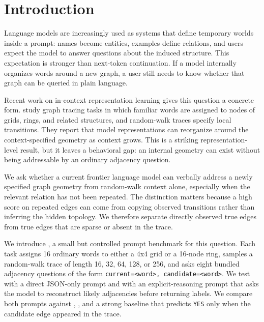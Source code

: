 \section{Introduction}
\label{sec:introduction}

Language models are increasingly used as systems that define temporary worlds inside a prompt: names become entities, examples define relations, and users expect the model to answer questions about the induced structure. This expectation is stronger than next-token continuation. If a model internally organizes words around a new graph, a user still needs to know whether that graph can be queried in plain language.

Recent work on in-context representation learning gives this question a concrete form. \citet{park2025iclr} study graph tracing tasks in which familiar words are assigned to nodes of grids, rings, and related structures, and random-walk traces specify local transitions. They report that model representations can reorganize around the context-specified geometry as context grows. This is a striking representation-level result, but it leaves a behavioral gap: an internal geometry can exist without being addressable by an ordinary adjacency question.

We ask whether a current frontier language model can verbally address a newly specified graph geometry from random-walk context alone, especially when the relevant relation has not been repeated. The distinction matters because a high score on repeated edges can come from copying observed transitions rather than inferring the hidden topology. We therefore separate directly observed true edges from true edges that are sparse or absent in the trace.

We introduce \taskname, a small but controlled prompt benchmark for this question. Each task assigns 16 ordinary words to either a 4x4 grid or a 16-node ring, samples a random-walk trace of length 16, 32, 64, 128, or 256, and asks eight bundled adjacency questions of the form \texttt{current=<word>, candidate=<word>}. We test \gptfourone with a direct JSON-only prompt and with an explicit-reasoning prompt that asks the model to reconstruct likely adjacencies before returning labels. We compare both prompts against \randombase, \alwaysnobase, and a strong \observedbaseline baseline that predicts \texttt{YES} only when the candidate edge appeared in the trace.


